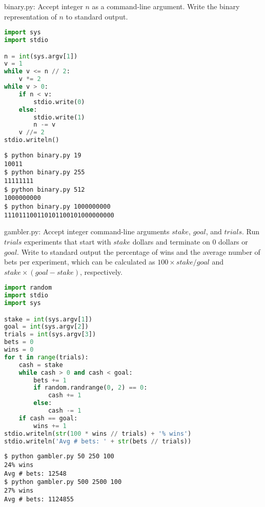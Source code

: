 \documentclass[8pt,a4paper,compress]{beamer}
\begin{document}
\begin{frame}[fragile]
\begin{framed}
\tiny binary.py: Accept integer $n$ as a command-line argument. Write the binary representation of $n$ to standard output.
\end{framed}

\begin{lstlisting}[language=Python]
import sys
import stdio

n = int(sys.argv[1])
v = 1
while v <= n // 2:
    v *= 2
while v > 0:
    if n < v:
        stdio.write(0)
    else:
        stdio.write(1)
        n -= v
    v //= 2
stdio.writeln()
\end{lstlisting}

\begin{lstlisting}[language={}]
$ python binary.py 19
10011
$ python binary.py 255
11111111
$ python binary.py 512
1000000000
$ python binary.py 1000000000
111011100110101100101000000000
\end{lstlisting}
\end{frame}

\begin{frame}[fragile]
\begin{framed}
\tiny gambler.py: Accept integer command-line arguments $stake$, $goal$, and $trials$. Run $trials$ experiments that start with $stake$ dollars and terminate on 0 dollars or $goal$. Write to standard output the percentage of wins and the average number of bets per experiment, which can be calculated as $100 \times stake / goal$ and $stake \times (goal - stake)$, respectively.
\end{framed}

\begin{lstlisting}[language=Python]
import random
import stdio
import sys

stake = int(sys.argv[1])
goal = int(sys.argv[2])
trials = int(sys.argv[3])
bets = 0
wins = 0
for t in range(trials):
    cash = stake
    while cash > 0 and cash < goal:
        bets += 1
        if random.randrange(0, 2) == 0:
            cash += 1
        else:
            cash -= 1
    if cash == goal:
        wins += 1
stdio.writeln(str(100 * wins // trials) + '% wins')
stdio.writeln('Avg # bets: ' + str(bets // trials))
\end{lstlisting}

\begin{lstlisting}[language={}]
$ python gambler.py 50 250 100
24% wins
Avg # bets: 12548
$ python gambler.py 500 2500 100
27% wins
Avg # bets: 1124855
\end{lstlisting}
\end{frame}
\end{document}
